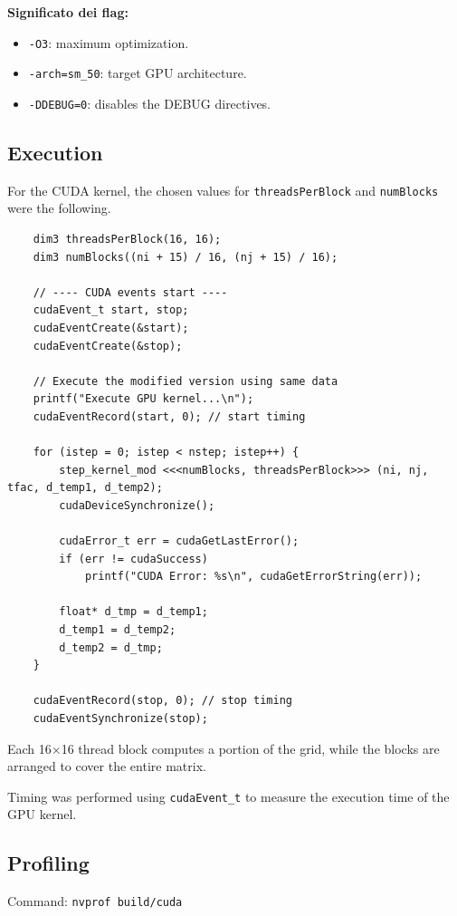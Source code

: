 \textbf{Significato dei flag:}
\begin{itemize}
    \item \texttt{-O3}: maximum optimization.
    \item \texttt{-arch=sm\_50}: target GPU architecture.
    \item \texttt{-DDEBUG=0}: disables the DEBUG directives.
\end{itemize}

\subsection{Execution}
For the CUDA kernel, the chosen values for \texttt{threadsPerBlock} and \texttt{numBlocks} were the following.

\begin{lstlisting}
    dim3 threadsPerBlock(16, 16);
    dim3 numBlocks((ni + 15) / 16, (nj + 15) / 16);

    // ---- CUDA events start ----
    cudaEvent_t start, stop;
    cudaEventCreate(&start);
    cudaEventCreate(&stop);

    // Execute the modified version using same data
    printf("Execute GPU kernel...\n");
    cudaEventRecord(start, 0); // start timing

    for (istep = 0; istep < nstep; istep++) {
        step_kernel_mod <<<numBlocks, threadsPerBlock>>> (ni, nj, tfac, d_temp1, d_temp2);
        cudaDeviceSynchronize();

        cudaError_t err = cudaGetLastError();
        if (err != cudaSuccess)
            printf("CUDA Error: %s\n", cudaGetErrorString(err));
        
        float* d_tmp = d_temp1;
        d_temp1 = d_temp2;
        d_temp2 = d_tmp;
    }

    cudaEventRecord(stop, 0); // stop timing
    cudaEventSynchronize(stop);

\end{lstlisting}

\noindent
Each 16×16 thread block computes a portion of the grid, while the blocks are arranged to cover the entire matrix.

\noindent
Timing was performed using \texttt{cudaEvent\_t} to measure the execution time of the GPU kernel.

\subsection{Profiling}
Command: \texttt{nvprof build/cuda}


